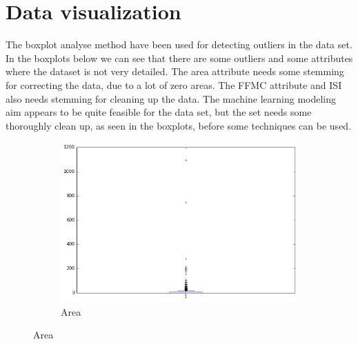 \section{Data visualization}

The boxplot analyse method have been used for detecting outliers in the data set. In the boxplots below we can see that there are some outliers and some attributes where the dataset is not very detailed. The area attribute needs some stemming for correcting the data, due to a lot of zero areas. The FFMC attribute and ISI also needs stemming for cleaning up the data. The machine learning modeling aim appears to be quite feasible for the data set, but the set needs some thoroughly clean up, as seen in the boxplots, before some techniques can be used. 

\begin{figure}[!ht]
\centering
\begin{subfigure}[b]{.45\linewidth}
\includegraphics[width=\linewidth]{fig/boxplots/area.png}
\caption{Area}\label{fig:mouse}
\end{subfigure}


\end{figure}
